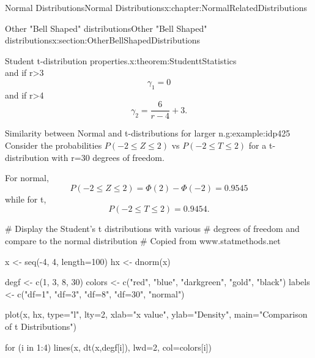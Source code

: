 \documentclass[oneside,10pt,]{book}
\numberwithin{equation}{section}
\begin{document}
\begin{chapterptx}{Normal Distributions}{}{Normal Distributions}{}{}{x:chapter:NormalRelatedDistributions}
\begin{sectionptx}{Other "Bell Shaped" distributions}{}{Other "Bell Shaped" distributions}{}{}{x:section:OtherBellShapedDistributions}
\begin{theorem}{Student t-distribution properties.}{}{x:theorem:StudenttStatistics}
\begin{equation*}
\end{equation*}
and if r\textgreater{}3%
\begin{equation*}
\gamma_1 = 0
\end{equation*}
and if r\textgreater{}4%
\begin{equation*}
\gamma_2 = \frac{6}{r-4} + 3.
\end{equation*}
%
\end{theorem}
%
\par
\begin{example}{Similarity between Normal and t-distributions for larger n.}{g:example:idp425}%
Consider the probabilities \(P(-2 \le Z \le 2)\) vs \(P(-2 \le T \le 2)\) for a t-distribution with r=30 degrees of freedom.%
\par
For normal,%
\begin{equation*}
P(-2 \le Z \le 2) = \Phi(2) - \Phi(-2) = 0.9545
\end{equation*}
while for t,%
\begin{equation*}
P(-2 \le T \le 2) = 0.9454.
\end{equation*}
%
\end{example}
%
\par
\leavevmode%
\begin{sageinput}
# Display the Student's t distributions with various
# degrees of freedom and compare to the normal distribution
# Copied from www.statmethods.net

x <- seq(-4, 4, length=100)
hx <- dnorm(x)

degf <- c(1, 3, 8, 30)
colors <- c("red", "blue", "darkgreen", "gold", "black")
labels <- c("df=1", "df=3", "df=8", "df=30", "normal")

plot(x, hx, type="l", lty=2, xlab="x value",
  ylab="Density", main="Comparison of t Distributions")

for (i in 1:4){
  lines(x, dt(x,degf[i]), lwd=2, col=colors[i])
}


\end{sageinput}
\end{sectionptx}
\end{chapterptx}
\end{document}

